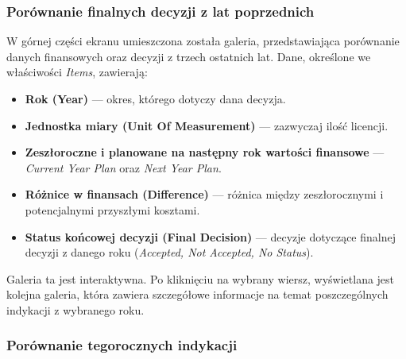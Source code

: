 \subsubsection*{Porównanie finalnych decyzji z lat poprzednich}

W górnej części ekranu umieszczona została galeria, przedstawiająca porównanie danych finansowych oraz decyzji z trzech ostatnich lat. Dane, określone we właściwości \emph{Items}, zawierają:

\begin{itemize}
\item \textbf{Rok (Year)} — okres, którego dotyczy dana decyzja.
\item \textbf{Jednostka miary (Unit Of Measurement)} — zazwyczaj ilość licencji.
\item \textbf{Zeszłoroczne i planowane na następny rok wartości finansowe} — \emph{Current Year Plan} oraz \emph{Next Year Plan}.
\item \textbf{Różnice w finansach (Difference)} — różnica między zeszłorocznymi i potencjalnymi przyszłymi kosztami.
\item \textbf{Status końcowej decyzji (Final Decision)} — decyzje dotyczące finalnej decyzji z danego roku (\emph{Accepted, Not Accepted, No Status}).
\end{itemize}




Galeria ta jest interaktywna. Po kliknięciu na wybrany wiersz, wyświetlana jest kolejna galeria, która zawiera szczegółowe informacje na temat poszczególnych indykacji z wybranego roku.

\subsubsection*{Porównanie tegorocznych indykacji}

